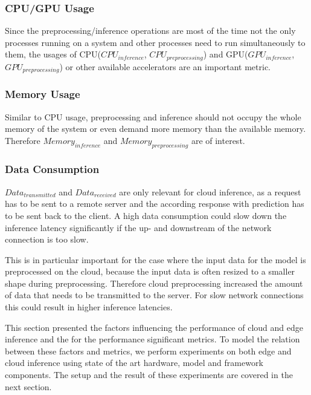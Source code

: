 \subsubsection{CPU/GPU Usage}
Since the preprocessing/inference operations are most of the time not the only processes running on a system and other processes need to run simultaneously to them, the usages of CPU($CPU_{inference}$, $CPU_{preprocessing}$) and GPU($GPU_{inference}$, $GPU_{preprocessing}$) or other available accelerators are an important metric.


\subsubsection{Memory Usage}
Similar to CPU usage, preprocessing and inference should not occupy the whole memory of the system or even demand more memory than the available memory. Therefore $Memory_{inference}$ and $Memory_{preprocessing}$ are of interest.

\subsubsection{Data Consumption}
$Data_{transmitted}$ and $Data_{received}$ are only relevant for cloud inference, as a request has to be sent to a remote server and the according response with prediction has to be sent back to the client. A high data consumption could slow down the inference latency significantly if the up- and downstream of the network connection is too slow. 

This is in particular important for the case where the input data for the model is preprocessed on the cloud, because the input data is often resized to a smaller shape during preprocessing. Therefore cloud preprocessing increased the amount of data that needs to be transmitted to the server. For slow network connections this could result in higher inference latencies.




This section presented the factors influencing the performance of cloud and edge inference and the for the performance significant metrics.
To model the relation between these factors and metrics, we perform experiments on both edge and cloud inference using state of the art hardware, model and framework components. The setup and the result of these experiments are covered in the next section.
\endinput 